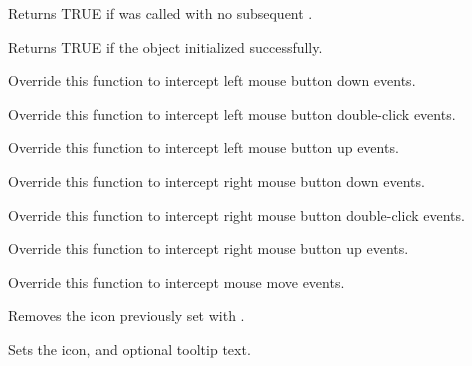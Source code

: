 
Returns TRUE if  was called with no subsequent .

\label{wxtaskbariconisok}


Returns TRUE if the object initialized successfully.

\label{wxtaskbaricononlbuttondown}


Override this function to intercept left mouse button down events.

\label{wxtaskbaricononlbuttondclick}


Override this function to intercept left mouse button double-click events.

\label{wxtaskbaricononlbuttonup}


Override this function to intercept left mouse button up events.

\label{wxtaskbaricononrbuttondown}


Override this function to intercept right mouse button down events.

\label{wxtaskbaricononrbuttondclick}


Override this function to intercept right mouse button double-click events.

\label{wxtaskbaricononrbuttonup}


Override this function to intercept right mouse button up events.

\label{wxtaskbaricononmousemove}


Override this function to intercept mouse move events.

\label{wxtaskbariconremoveicon}


Removes the icon previously set with .

\label{wxtaskbariconseticon}


Sets the icon, and optional tooltip text.


